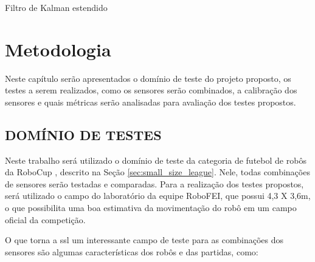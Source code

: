 \documentclass[acronym, symbols, table]{fei}
\begin{document}
			\begin{algorithm}
					\caption{Filtro de Kalman estendido}\label{alg:ekf_algoritmo}
			\end{algorithm}
			
\chapter{Metodologia}\label{sec:metodologia}

	Neste capítulo serão apresentados o domínio de teste do projeto proposto, os testes a serem realizados, como os sensores serão combinados, a calibração dos sensores e quais métricas serão analisadas para avaliação dos testes propostos.
	
	\section{DOMÍNIO DE TESTES}
	
		Neste trabalho será utilizado o domínio de teste da categoria  de futebol de robôs da RoboCup \cite{RoboCup}, descrito na Seção \ref{sec:small_size_league}. Nele, todas combinações de sensores serão testadas e comparadas. Para a realização dos testes propostos, será utilizado o campo do laboratório da equipe RoboFEI, que possui 4,3 X 3,6m, o que possibilita uma boa estimativa da movimentação do robô em um campo oficial da competição.
		
		O que torna a \acrshort{ssl} um interessante campo de teste para as combinações dos sensores são algumas características dos robôs e das partidas, como:
		
\end{document}
